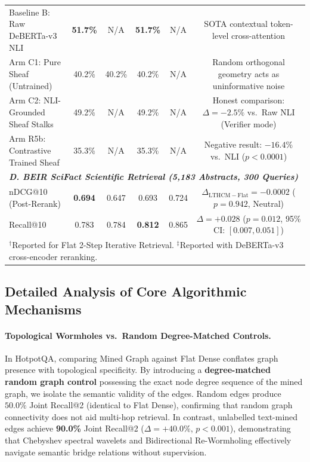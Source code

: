 \documentclass[11pt,a4paper]{article}
\begin{document}
\begin{table}[t]
\begin{tabular}{lccccc}
Baseline B: Raw DeBERTa-v3 NLI & \textbf{51.7\%} & N/A & \textbf{51.7\%} & N/A & SOTA contextual token-level cross-attention \\
Arm C1: Pure Sheaf (Untrained) & 40.2\% & 40.2\% & 40.2\% & N/A & Random orthogonal geometry acts as uninformative noise \\
Arm C2: NLI-Grounded Sheaf Stalks & 49.2\% & N/A & 49.2\% & N/A & Honest comparison: $\Delta = -2.5\%$ vs.\ Raw NLI (Verifier mode) \\
Arm R5b: Contrastive Trained Sheaf & 35.3\% & N/A & 35.3\% & N/A & Negative result: $-16.4\%$ vs.\ NLI ($p < 0.0001$) \\
\midrule
\multicolumn{6}{l}{\textit{\textbf{D. BEIR SciFact Scientific Retrieval (5,183 Abstracts, 300 Queries)}}} \\
nDCG@10 (Post-Rerank) & \textbf{0.694} & 0.647 & 0.693 & 0.724 & $\Delta_{\mathrm{LTHCM} - \mathrm{Flat}} = -0.0002$ ($p = 0.942$, Neutral) \\
Recall@10 & 0.783 & 0.784 & \textbf{0.812} & 0.865 & $\Delta = +0.028$ ($p = 0.012$, 95\% CI: $[0.007, 0.051]$) \\
\bottomrule
\multicolumn{6}{l}{\footnotesize $^\dagger$Reported for Flat 2-Step Iterative Retrieval. $^\ddagger$Reported with DeBERTa-v3 cross-encoder reranking.} \\
\end{tabular}
\end{table}

\subsection{Detailed Analysis of Core Algorithmic Mechanisms}
\label{sec:benchmark_limitations}

\paragraph{Topological Wormholes vs.\ Random Degree-Matched Controls.}
In HotpotQA, comparing Mined Graph against Flat Dense conflates graph presence with topological specificity. By introducing a \textbf{degree-matched random graph control} possessing the exact node degree sequence of the mined graph, we isolate the semantic validity of the edges. Random edges produce $50.0\%$ Joint Recall@2 (identical to Flat Dense), confirming that random graph connectivity does not aid multi-hop retrieval. In contrast, unlabelled text-mined edges achieve \textbf{90.0\%} Joint Recall@2 ($\Delta = +40.0\%$, $p < 0.001$), demonstrating that Chebyshev spectral wavelets and Bidirectional Re-Wormholing effectively navigate semantic bridge relations without supervision.
\end{document}
